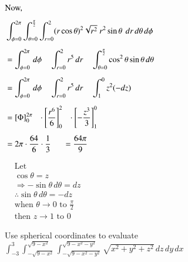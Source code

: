 \documentclass[11pt]{extarticle}
\newcommand{\dx}{{\,dx}}
\newcommand{\dy}{{\,dy}}
\newcommand{\dz}{{\,dz}}
\newcommand{\dr}{{\,dr}}
\newcommand{\dtheta}{{\,d\theta}}
\newcommand{\dphi}{{\,d\phi}}
\begin{document}
\begin{minipage}[t]{0.66\linewidth}
\noindent
   \begin{adjustbox}{valign=t}
      $\begin{aligned}
         & \text{Now, }\\[1ex]
         & \int_{\phi=0}^{2 \pi} \int_{\theta=0}^{\frac{\pi}{2}} \int_{r=0}^2(r\cos\theta)^2 \sqrt{r^2} \ r^2\sin\theta \ \dr\dtheta\dphi\\[1ex]
         & =\int_{\phi=0}^{2 \pi} \dphi \quad
         \int_{r=0}^2 r^5 \dr \quad
         \int_{\theta=0}^{\frac{\pi}{2}}\cos^2\theta\sin\theta\dtheta \\[1ex]
         & =\int_{\phi=0}^{2 \pi} \dphi \quad
         \int_{r=0}^2 r^5 \dr \quad
         \int_1^0 z^2(-dz) \\[1ex]
         & = \left[\Phi\right]_0^{2 \pi} \tab \cdot 
         \left[\frac{r^6}{6}\right]_0^2 \tab \cdot
         \left[-\frac{z^3}{3}\right]_1^0\\[1ex]
         & = 2\pi \cdot \frac{64}{6} \cdot
         \frac{1}{3} \tabs =\frac{64\pi}{9}
      \end{aligned}$
   \end{adjustbox}
\end{minipage}
\begin{minipage}[t]{0.32\linewidth}
\noindent
   \begin{adjustbox}{valign=t}
      \divideX
      $\begin{aligned}
         & \text {Let } \\
         & \cos \theta = z \\
         & \Rightarrow -\sin\theta \dtheta= dz \\
         & \therefore \sin\theta \dtheta= -dz \\[2ex]
         & \text {when } \theta \rightarrow 0 \text { \ to \ } \frac{\pi} {2} \\
         & \text {then } z \rightarrow 1 \text { \ to \ } 0
      \end{aligned}$
   \end{adjustbox}
\end{minipage}




\vspace{4ex}
\textbf{} Use spherical coordinates to evaluate
$\int_{-3}^3 \int_{-\sqrt{9-x^2}}^{\sqrt{9-x^2}} \int_{-\sqrt{9-x^2-y^2}}^{\sqrt{9-x^2-y^2}} \sqrt{x^2+y^2+z^2} \dz\dy\dx$
\end{document}
